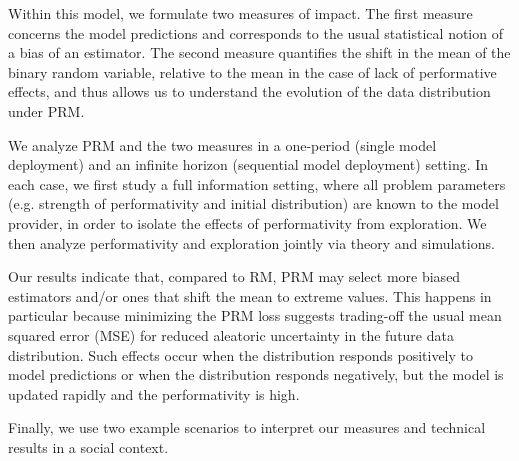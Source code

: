 Within this model, we formulate two measures of impact. The first measure concerns the model predictions and corresponds to the usual statistical notion of a bias of an estimator. The second measure quantifies the shift in the mean of the binary random variable, relative to the mean in the case of lack of performative effects, and thus allows us to understand the evolution of the data distribution under PRM. 

We analyze PRM and the two measures in a one-period (single model deployment) and an infinite horizon (sequential model deployment) setting. In each case, we first study a full
information setting, where all problem parameters (e.g. strength of performativity and initial distribution) are known to the model provider, in
order to isolate the effects of performativity from exploration. We then analyze performativity and exploration jointly via theory and simulations.

Our results indicate that, compared to RM, PRM may select more biased estimators and/or ones that shift the mean to extreme values. This happens in particular because minimizing the PRM loss suggests trading-off the usual mean squared error (MSE) for reduced aleatoric uncertainty in the future data distribution. Such effects occur when the distribution responds positively to model
predictions or when the distribution responds negatively, but the model is
updated rapidly and the performativity is high.

Finally, we use two example scenarios to interpret our measures and technical results in a social context. 
